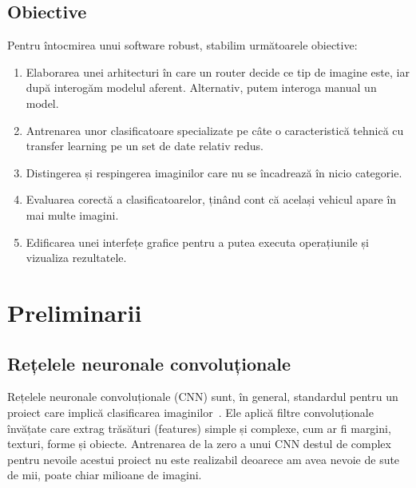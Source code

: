 \documentclass[12pt, a4paper, openany]{book}
\begin{document}
\section{Obiective}
\label{subsec:obiective}

Pentru întocmirea unui software robust, stabilim următoarele obiective:
\begin{enumerate}
\item Elaborarea unei arhitecturi în care un router decide ce tip de imagine este, iar după interogăm modelul aferent. Alternativ, putem interoga manual un model.
\item Antrenarea unor clasificatoare specializate pe câte o caracteristică tehnică cu transfer learning pe un set de date relativ redus.
\item Distingerea și respingerea imaginilor care nu se încadrează în nicio categorie.
\item Evaluarea corectă a clasificatoarelor, ținând cont că același vehicul apare în mai multe imagini.
\item Edificarea unei interfețe grafice pentru a putea executa operațiunile și vizualiza rezultatele.
\end{enumerate}



\chapter{Preliminarii}
\label{tehnologii}
\section{Rețelele neuronale convoluționale  }
Rețelele neuronale convoluționale (CNN) sunt, în general, standardul pentru un proiect care implică clasificarea imaginilor~\cite{krizhevsky2012alexnet}. Ele aplică filtre convoluționale învățate care extrag trăsături (features) simple și complexe, cum ar fi margini, texturi, forme și obiecte. Antrenarea de la zero a unui CNN destul de complex pentru nevoile acestui proiect nu este realizabil deoarece am avea nevoie de sute de mii, poate chiar milioane de imagini.
\end{document}
